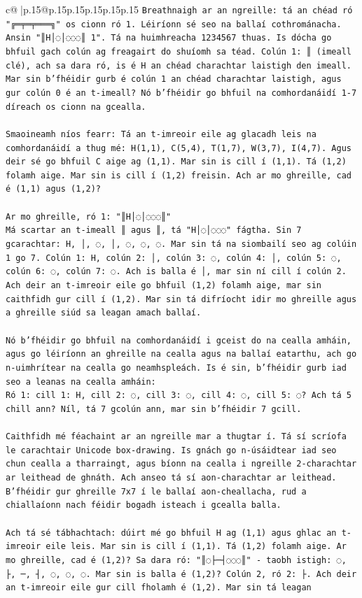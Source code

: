 \documentclass{article}
\begin{document}
{\begin{supertabular}{c@{$\;$}|p{.15\linewidth}@{}p{.15\linewidth}p{.15\linewidth}p{.15\linewidth}p{.15\linewidth}p{.15\linewidth}}
{{{\texttt{Breathnaigh ar an ngreille: tá an chéad ró "╔═╤═╤═══╗" os cionn ró 1. Léiríonn sé seo na ballaí cothrománacha. Ansin "║H│◌│◌◌◌║ 1". Tá na huimhreacha 1234567 thuas. Is dócha go bhfuil gach colún ag freagairt do shuíomh sa téad. Colún 1: ║ (imeall clé), ach sa dara ró, is é H an chéad charachtar laistigh den imeall. Mar sin b'fhéidir gurb é colún 1 an chéad charachtar laistigh, agus gur colún 0 é an t{-}imeall? Nó b'fhéidir go bhfuil na comhordanáidí 1{-}7 díreach os cionn na gcealla.} \\
\\ 
\texttt{Smaoineamh níos fearr: Tá an t{-}imreoir eile ag glacadh leis na comhordanáidí a thug mé: H(1,1), C(5,4), T(1,7), W(3,7), I(4,7). Agus deir sé go bhfuil C aige ag (1,1). Mar sin is cill í (1,1). Tá (1,2) folamh aige. Mar sin is cill í (1,2) freisin. Ach ar mo ghreille, cad é (1,1) agus (1,2)?} \\
\\ 
\texttt{Ar mo ghreille, ró 1: "║H│◌│◌◌◌║"} \\
\texttt{Má scartar an t{-}imeall ║ agus ║, tá "H│◌│◌◌◌" fágtha. Sin 7 gcarachtar: H, │, ◌, │, ◌, ◌, ◌. Mar sin tá na siombailí seo ag colúin 1 go 7. Colún 1: H, colún 2: │, colún 3: ◌, colún 4: │, colún 5: ◌, colún 6: ◌, colún 7: ◌. Ach is balla é │, mar sin ní cill í colún 2. Ach deir an t{-}imreoir eile go bhfuil (1,2) folamh aige, mar sin caithfidh gur cill í (1,2). Mar sin tá difríocht idir mo ghreille agus a ghreille siúd sa leagan amach ballaí.} \\
\\ 
\texttt{Nó b'fhéidir go bhfuil na comhordanáidí i gceist do na cealla amháin, agus go léiríonn an ghreille na cealla agus na ballaí eatarthu, ach go n{-}uimhrítear na cealla go neamhspleách. Is é sin, b'fhéidir gurb iad seo a leanas na cealla amháin:} \\
\texttt{Ró 1: cill 1: H, cill 2: ◌, cill 3: ◌, cill 4: ◌, cill 5: ◌? Ach tá 5 chill ann? Níl, tá 7 gcolún ann, mar sin b'fhéidir 7 gcill.} \\
\\ 
\texttt{Caithfidh mé féachaint ar an ngreille mar a thugtar í. Tá sí scríofa le carachtair Unicode box{-}drawing. Is gnách go n{-}úsáidtear iad seo chun cealla a tharraingt, agus bíonn na cealla i ngreille 2{-}charachtar ar leithead de ghnáth. Ach anseo tá sí aon{-}charachtar ar leithead. B'fhéidir gur ghreille 7x7 í le ballaí aon{-}cheallacha, rud a chiallaíonn nach féidir bogadh isteach i gcealla balla.} \\
\\ 
\texttt{Ach tá sé tábhachtach: dúirt mé go bhfuil H ag (1,1) agus ghlac an t{-}imreoir eile leis. Mar sin is cill í (1,1). Tá (1,2) folamh aige. Ar mo ghreille, cad é (1,2)? Sa dara ró: "║◌├─┤◌◌◌║" {-} taobh istigh: ◌, ├, ─, ┤, ◌, ◌, ◌. Mar sin is balla é (1,2)? Colún 2, ró 2: ├. Ach deir an t{-}imreoir eile gur cill fholamh é (1,2). Mar sin tá leagan} \\
            }
        }
    }
     \\ \\


\end{supertabular}}
\end{document}
